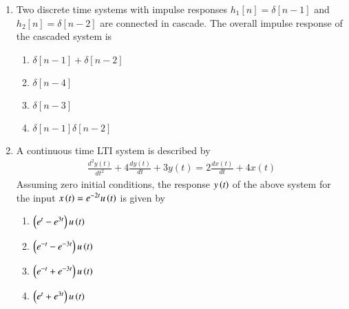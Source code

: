 \renewcommand{\theequation}{\theenumi}
\begin{enumerate}[label=\arabic*.,ref=\theenumi]

\item Two discrete time systems with impulse responses $h_1[n]=\delta[n-1]$ and $h_2[n]=\delta[n-2]$ are connected in cascade. The overall impulse response of the cascaded system is
\begin{enumerate}
    \item $\delta[n-1]+\delta[n-2]$
    \item $\delta[n-4]$
    \item $\delta[n-3]$
    \item $\delta[n-1]\delta[n-2]$
\end{enumerate}
\solution



\item A continuous time LTI system is described by
\begin{align}
    \frac{d^2y(t)}{dt^2}+4\frac{dy(t)}{dt}+3y(t) = 2\frac{dx(t)}{dt}+4x(t)\label{ec/2010/41/q}
\end{align}
Assuming zero initial conditions, the response $y\left(t\right)$ of the above system for the input $x\left(t\right)=e^{-2t}u\left(t\right)$ is given by
\begin{enumerate}
    \item $\left(e^t-e^{3t}\right)u\left(t\right)$
    \item $\left(e^{-t}-e^{-3t}\right)u\left(t\right)$
    \item $\left(e^{-t}+e^{-3t}\right)u\left(t\right)$
    \item $\left(e^{t}+e^{3t}\right)u\left(t\right)$
\end{enumerate}
\solution



\end{enumerate}

